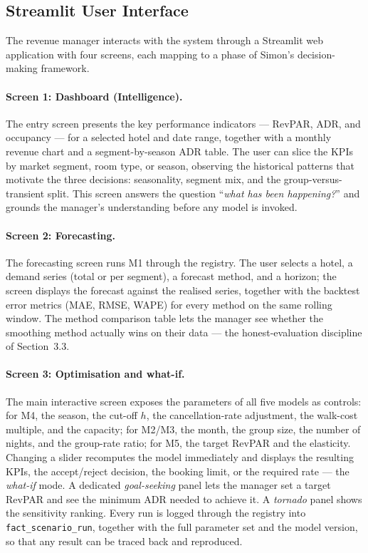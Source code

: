 \subsection{Streamlit User Interface}

The revenue manager interacts with the system through a Streamlit web application with four screens, each mapping to a phase of Simon's decision-making framework.

\paragraph{Screen 1: Dashboard (Intelligence).}
The entry screen presents the key performance indicators --- RevPAR, ADR, and occupancy --- for a selected hotel and date range, together with a monthly revenue chart and a segment-by-season ADR table. The user can slice the KPIs by market segment, room type, or season, observing the historical patterns that motivate the three decisions: seasonality, segment mix, and the group-versus-transient split. This screen answers the question ``\emph{what has been happening?}'' and grounds the manager's understanding before any model is invoked.

\paragraph{Screen 2: Forecasting.}
The forecasting screen runs M1 through the registry. The user selects a hotel, a demand series (total or per segment), a forecast method, and a horizon; the screen displays the forecast against the realised series, together with the backtest error metrics (MAE, RMSE, WAPE) for every method on the same rolling window. The method comparison table lets the manager see whether the smoothing method actually wins on their data --- the honest-evaluation discipline of Section~3.3.

\paragraph{Screen 3: Optimisation and what-if.}
The main interactive screen exposes the parameters of all five models as controls: for M4, the season, the cut-off $h$, the cancellation-rate adjustment, the walk-cost multiple, and the capacity; for M2/M3, the month, the group size, the number of nights, and the group-rate ratio; for M5, the target RevPAR and the elasticity. Changing a slider recomputes the model immediately and displays the resulting KPIs, the accept/reject decision, the booking limit, or the required rate --- the \emph{what-if} mode. A dedicated \emph{goal-seeking} panel lets the manager set a target RevPAR and see the minimum ADR needed to achieve it. A \emph{tornado} panel shows the sensitivity ranking. Every run is logged through the registry into \texttt{fact\_scenario\_run}, together with the full parameter set and the model version, so that any result can be traced back and reproduced.

